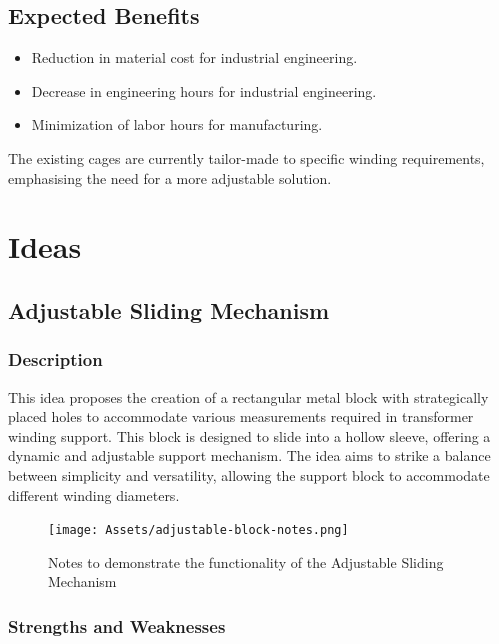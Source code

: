 \documentclass[a4paper,10pt]{article}
\begin{document}
\subsection{Expected Benefits}
\begin{itemize}
  \item Reduction in material cost for industrial engineering.
  \item Decrease in engineering hours for industrial engineering.
  \item Minimization of labor hours for manufacturing.
\end{itemize}

The existing cages are currently tailor-made to specific winding requirements, emphasising the need for a more adjustable solution.





\section{Ideas}

\subsection{Adjustable Sliding Mechanism}

\subsubsection{Description}

This idea proposes the creation of a rectangular metal block with strategically placed holes to accommodate various measurements required in transformer winding support. This block is designed to slide into a hollow sleeve, offering a dynamic and adjustable support mechanism. The idea aims to strike a balance between simplicity and versatility, allowing the support block to accommodate different winding diameters.

\begin{figure}[H]
  \centering
  \texttt{[image: Assets/adjustable-block-notes.png]}
  \caption{Notes to demonstrate the functionality of the Adjustable Sliding Mechanism}
  \label{fig:adjustable-block-notes}
\end{figure}

\subsubsection{Strengths and Weaknesses}
\end{document}
